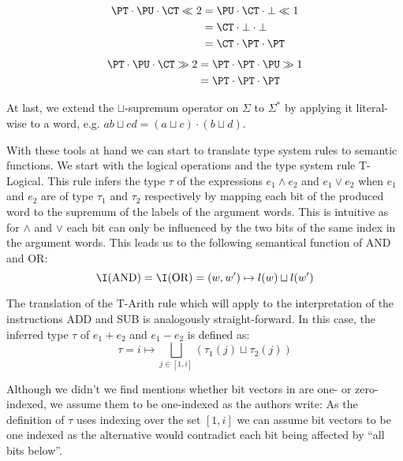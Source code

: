 \begin{example}
    \begin{align*}
        \PT \cdot \PU \cdot \CT \ll 2 &= \PU \cdot \CT \cdot \bot \ll 1 \\
        &= \CT \cdot \bot \cdot \bot \\
        &= \CT \cdot \PT \cdot \PT
    \end{align*}
    \begin{align*}
        \PT \cdot \PU \cdot \CT \gg 2 &= \PT \cdot \PT \cdot \PU \gg 1 \\
        &= \PT \cdot \PT \cdot \PT
    \end{align*}
\end{example}

At last, we extend the $ \sqcup $-supremum operator on $ \Sigma $ to $ \Sigma^* $ by applying it literal-wise to a word, e.g. $ ab \sqcup cd = (a \sqcup c) \cdot (b \sqcup d) $.

With these tools at hand we can start to translate type system rules to semantic functions.
We start with the logical operations and the type system rule T-Logical.
This rule infers the type $ \tau $ of the expressions $ e_1 \land e_2 $ and $ e_1 \lor e_2 $ when $ e_1 $ and $ e_2 $ are of type $ \tau_1 $ and $ \tau_2 $ respectively by mapping each bit of the produced word to the supremum of the labels of the argument words.
This is intuitive as for $ \land $ and $ \lor $ each bit can only be influenced by the two bits of the same index in the argument words.
This leads us to the following semantical function of AND and OR:
\begin{equation*}
    \I(\text{AND}) = \I(\text{OR}) = (w, w') \mapsto l(w) \sqcup l(w')
\end{equation*}

The translation of the T-Arith rule which will apply to the interpretation of the instructions ADD and SUB is analogously straight-forward.
In this case, the inferred type $ \tau $ of $ e_1 + e_2 $ and $ e_1 - e_2 $ is defined as:
\begin{equation*}
    \tau = i \mapsto \bigsqcup_{j \in [1, i]} (\tau_1(j) \sqcup \tau_2(j))
\end{equation*}

Although we didn't we find mentions whether bit vectors in \cite{Ferraiuolo17} are one- or zero-indexed, we assume them to be one-indexed as the authors write: 
As the definition of $ \tau $ uses indexing over the set $ [ 1, i ] $ we can assume bit vectors to be one indexed as the alternative would contradict each bit being affected by \enquote{all bits below}.

